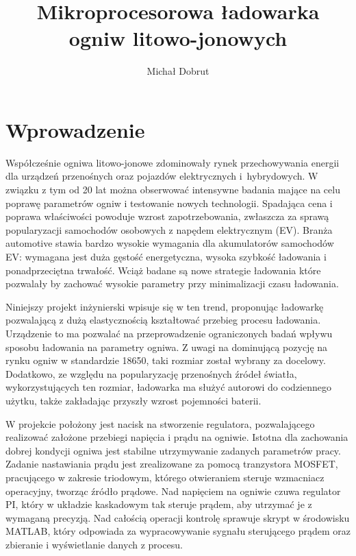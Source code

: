 \documentclass[polish,engineer]{polsl-msth}
\author{Michał Dobrut}
\title{Mikroprocesorowa ładowarka ogniw litowo-jonowych}
\begin{document}
\frontmatter
\maketitle
\makestatement
\tableofcontents
\listoftables
\listoffigures
\mainmatter


\chapter{Wprowadzenie}

Współcześnie ogniwa litowo-jonowe zdominowały rynek przechowywania energii dla urządzeń przenośnych oraz pojazdów elektrycznych i~hybrydowych. W związku z tym od 20 lat można obserwować intensywne badania mające na celu poprawę parametrów ogniw i testowanie nowych technologii. Spadająca cena i poprawa właściwości powoduje wzrost zapotrzebowania, zwłaszcza za sprawą popularyzacji samochodów osobowych z napędem elektrycznym (EV). Branża automotive stawia bardzo wysokie wymagania dla akumulatorów samochodów EV: wymagana jest duża gęstość energetyczna, wysoka szybkość ładowania i ponadprzeciętna trwałość. Wciąż badane są nowe strategie ładowania które pozwalały by zachować wysokie parametry przy minimalizacji czasu ładowania.

Niniejszy projekt inżynierski wpisuje się w ten trend, proponując ładowarkę pozwalającą z dużą elastycznością kształtować przebieg procesu ładowania. Urządzenie to ma pozwalać na przeprowadzenie ograniczonych badań wpływu sposobu ładowania na parametry ogniwa. Z uwagi na dominującą pozycję na rynku ogniw w standardzie 18650, taki rozmiar został wybrany za docelowy. Dodatkowo, ze względu na popularyzację przenośnych źródeł światła, wykorzystujących ten rozmiar, ładowarka ma służyć autorowi do codziennego użytku, także zakładając przyszły wzrost pojemności baterii.

W projekcie położony jest nacisk na stworzenie regulatora, pozwalającego realizować założone przebiegi napięcia i prądu na ogniwie. Istotna dla zachowania dobrej kondycji ogniwa jest stabilne utrzymywanie zadanych parametrów pracy. Zadanie nastawiania prądu jest zrealizowane za pomocą tranzystora MOSFET, pracującego w zakresie triodowym, którego otwieraniem steruje wzmacniacz operacyjny, tworząc źródło prądowe. Nad napięciem na ogniwie czuwa regulator PI, który w układzie kaskadowym tak steruje prądem, aby utrzymać je z wymaganą precyzją. Nad całością operacji kontrolę sprawuje skrypt w środowisku MATLAB, który odpowiada za wypracowywanie sygnału sterującego prądem oraz zbieranie i wyświetlanie danych z procesu.
\end{document}
